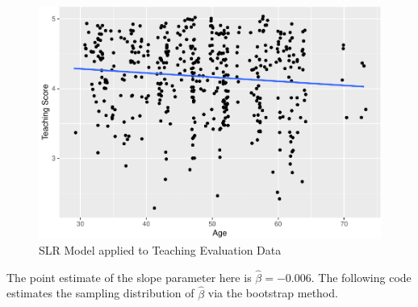 \documentclass[]{article}
\newenvironment{Shaded}{\begin{snugshade}}{\end{snugshade}}
\newcommand{\KeywordTok}[1]{\textcolor[rgb]{0.13,0.29,0.53}{\textbf{#1}}}
\newcommand{\DataTypeTok}[1]{\textcolor[rgb]{0.13,0.29,0.53}{#1}}
\newcommand{\DecValTok}[1]{\textcolor[rgb]{0.00,0.00,0.81}{#1}}
\newcommand{\StringTok}[1]{\textcolor[rgb]{0.31,0.60,0.02}{#1}}
\newcommand{\OperatorTok}[1]{\textcolor[rgb]{0.81,0.36,0.00}{\textbf{#1}}}
\newcommand{\NormalTok}[1]{#1}
\begin{document}
\begin{figure}
\centering
\includegraphics{DAWeek8_files/figure-latex/slr.model-1.pdf}
\caption{\label{fig.plot1}SLR Model applied to Teaching Evaluation Data}
\end{figure}

The point estimate of the slope parameter here is
\(\hat{\beta} = -0.006\). The following code estimates the sampling
distribution of \(\hat{\beta}\) via the bootstrap method.

\begin{Shaded}
\end{Shaded}
\end{document}
